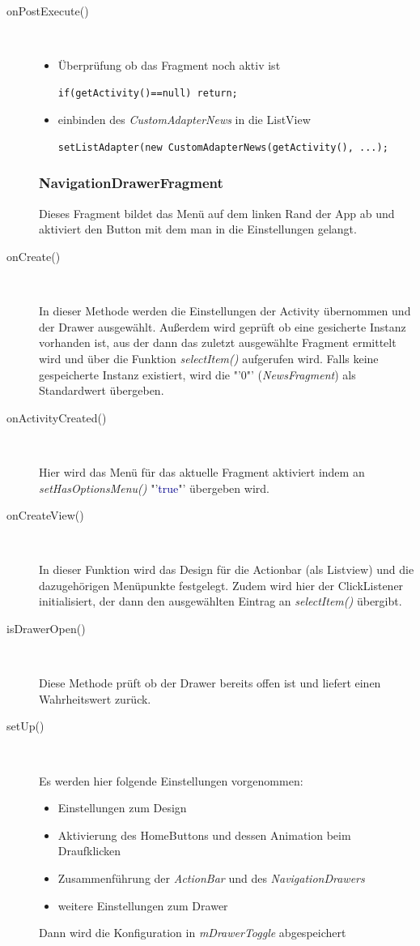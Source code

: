 \begin{description}
\item[onPostExecute()]~\par
\begin{itemize}
\item  Überprüfung ob das Fragment noch aktiv ist
\begin{lstlisting}
if(getActivity()==null) return;
\end{lstlisting}
\item einbinden des \textit{CustomAdapterNews} in die ListView
\begin{lstlisting}
setListAdapter(new CustomAdapterNews(getActivity(), ...);
\end{lstlisting}
\end{itemize}

\subsubsection{NavigationDrawerFragment}
Dieses Fragment bildet das Menü auf dem linken Rand der App ab und aktiviert den Button mit dem man in die Einstellungen gelangt.

\item[onCreate()]~\par
In dieser Methode werden die Einstellungen der Activity übernommen und der Drawer ausgewählt. Außerdem wird geprüft ob eine gesicherte Instanz vorhanden ist, aus der dann das zuletzt ausgewählte Fragment ermittelt wird und über die Funktion \textit{selectItem()} aufgerufen wird. Falls keine gespeicherte Instanz existiert, wird die "'0"' (\textit{NewsFragment}) als Standardwert übergeben.
 
\item[onActivityCreated()]~\par
Hier wird das Menü für das aktuelle Fragment aktiviert indem an \textit{setHasOptionsMenu()} "'\textcolor{darkblue}{true}"' übergeben wird.
 
\item[onCreateView()]~\par
In dieser Funktion wird das Design für die Actionbar (als Listview) und die dazugehörigen Menüpunkte festgelegt. Zudem wird hier der ClickListener initialisiert, der dann den ausgewählten Eintrag an \textit{selectItem()} übergibt.

\item[isDrawerOpen()]~\par
Diese Methode prüft ob der Drawer bereits offen ist und liefert einen Wahrheitswert zurück.
 
\item[setUp()]~\par
Es werden hier folgende Einstellungen vorgenommen:
\begin{itemize}
\item Einstellungen zum Design
\item Aktivierung des HomeButtons und dessen Animation beim Draufklicken
\item Zusammenführung der \textit{ActionBar} und des \textit{NavigationDrawers}
\item weitere Einstellungen zum Drawer
\end{itemize}
Dann wird die Konfiguration in \textit{mDrawerToggle} abgespeichert


\end{description}
